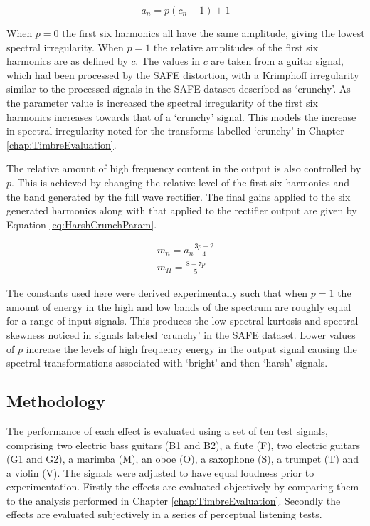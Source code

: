 			\begin{equation}
				a_{n} = p(c_{n} - 1) + 1
				\label{eq:HarshCrunchAmps}
			\end{equation}

			When $p = 0$ the first six harmonics all have the same amplitude, giving the lowest spectral
			irregularity. When $p = 1$ the relative amplitudes of the first six harmonics are as defined by
			$c$.  The values in $c$ are taken from a guitar signal, which had been processed by the SAFE
			distortion, with a Krimphoff irregularity similar to the processed signals in the SAFE dataset
			described as `crunchy'. As the parameter value is increased the spectral irregularity of the first
			six harmonics increases towards that of a `crunchy' signal. This models the increase in spectral
			irregularity noted for the transforms labelled `crunchy' in Chapter \ref{chap:TimbreEvaluation}.
			
			The relative amount of high frequency content in the output is also controlled by $p$. This is
			achieved by changing the relative level of the first six harmonics and the band generated by the
			full wave rectifier. The final gains applied to the six generated harmonics along with that applied
			to the rectifier output are given by Equation \ref{eq:HarshCrunchParam}.

			\begin{gather}
				m_{n} = a_{n}\frac{3p + 2}{4} \nonumber \\
				m_{H} = \frac{8 - 7p}{5}
				\label{eq:HarshCrunchParam}
			\end{gather}

			The constants used here were derived experimentally such that when $p = 1$ the amount of energy in
			the high and low bands of the spectrum are roughly equal for a range of input signals. This
			produces the low spectral kurtosis and spectral skewness noticed in signals labeled `crunchy' in
			the SAFE dataset. Lower values of $p$ increase the levels of high frequency energy in the output
			signal causing the spectral transformations associated with `bright' and then `harsh' signals.

	\subsection{Methodology}
	\label{sec:PerceptualExperiments-SemanticControl-Methodology}
		The performance of each effect is evaluated using a set of ten test signals, comprising two electric bass
		guitars (B1 and B2), a flute (F), two electric guitars (G1 and G2), a marimba (M), an oboe (O), a saxophone
		(S), a trumpet (T) and a violin (V). The signals were adjusted to have equal loudness prior to
		experimentation.  Firstly the effects are evaluated objectively by comparing them to the analysis performed
		in Chapter \ref{chap:TimbreEvaluation}. Secondly the effects are evaluated subjectively in a series of
		perceptual listening tests.

